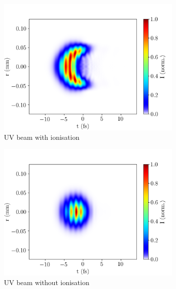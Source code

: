\documentclass[a4paper]{jpconf}
\begin{document}
\begin{figure}[h]
\begin{subfigure}{0.49\textwidth}
        \includegraphics[width=\textwidth]{im/UV_pulse_output_Ar_ion}
    \caption{UV beam with ionisation}
    \end{subfigure}
    \begin{subfigure}{0.49\textwidth}
        \includegraphics[width=\textwidth]{im/UV_pulse_output_Ar_no_ion}
    \caption{UV beam without ionisation}
    \end{subfigure}   
     \begin{subfigure}{0.49\textwidth}

\end{subfigure}
\end{figure}
\end{document}
